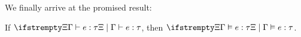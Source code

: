 We finally arrive at the promised result:

\begin{theoremnoproof}
    If $\typerel{\Xi}{\Gamma}{e}{\tau}$, then $\semtype{\Xi}{\Gamma}{e}{\tau}$.
\end{theoremnoproof}


    






















